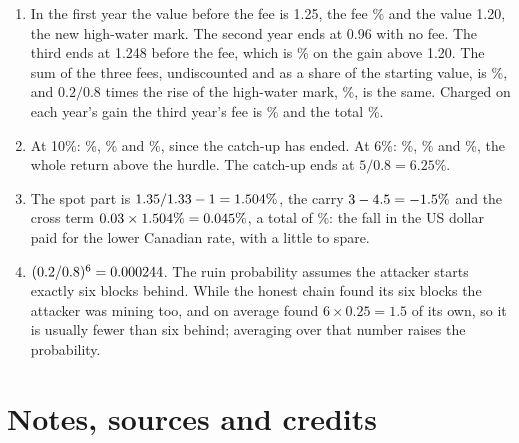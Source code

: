\begin{chapterrefs}
\begin{enumerate}[label=\textbf{9.\arabic*}, leftmargin=*]
  $100\%/\sqrt{10}$. $\E\max$ of twenty standard normals is \exJMax, so the best token's expected average
  is $\exJMax\times100/\sqrt{10}=\exJBest\%$ a year, though none of the twenty has any expected return.
  \item In the first year the value before the fee is 1.25, the fee \exKOne\% and the value 1.20, the new
  high-water mark. The second year ends at 0.96 with no fee. The third ends at 1.248 before the fee, which
  is \exKThree\% on the gain above 1.20. The sum of the three fees, undiscounted and as a share of the starting value, is \exKTot\%, and $0.2/0.8$ times the rise of the high-water
  mark, \exKRise\%, is the same. Charged on each year's gain the third year's fee is \exKResetThree\% and the total
  \exKReset\%.
  \item At 10\%: \exLNTen\%, \exLHTen\% and \exLSTen\%, since the catch-up has ended. At 6\%: \exLNSix\%, \exLHSix\% and
  \exLSSix\%, the whole return above the hurdle. The catch-up ends at $5/0.8=6.25\%$.
  \item The spot part is $1.35/1.33-1=1.504\%$, the carry $3-4.5=-1.5\%$ and the cross term
  $0.03\times1.504\%=0.045\%$, a total of \exMEx\%: the fall in the US dollar paid for the lower
  Canadian rate, with a little to spare.
  \item $(0.2/0.8)^6=0.000244$. The ruin probability assumes the attacker starts exactly six blocks behind.
  While the honest chain found its six blocks the attacker was mining too, and on average found
  $6\times0.25=1.5$ of its own, so it is usually fewer than six behind; averaging over that number raises the
  probability.
\end{enumerate}

\FloatBarrier
\section{Notes, sources and credits}
\label{sec9:credits}


\end{chapterrefs}
